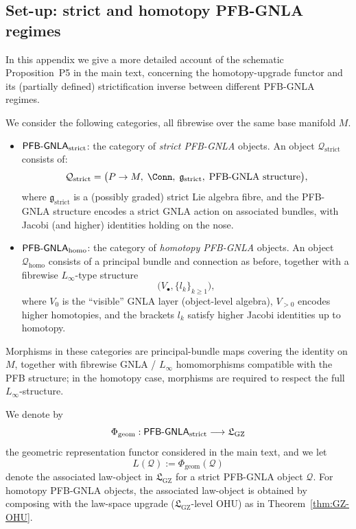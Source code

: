 \documentclass[11pt]{book}
\theoremstyle{plain}
\theoremstyle{definition}
\newcommand{\GZLS}{\ensuremath{\mathfrak{L}_{\mathrm{GZ}}}}       \newcommand{\GZLT}{\ensuremath{M_{!w}}}                           \newcommand{\GZLOC}{\ensuremath{A_M}}                             \newcommand{\GZLCurv}{\ensuremath{\mathcal{F}_{\mathrm{law}}}}
\begin{document}
\subsection*{Set-up: strict and homotopy PFB-GNLA regimes}


In this appendix we give a more detailed account of the schematic
Proposition~P5 in the main text, concerning the homotopy-upgrade
functor and its (partially defined) strictification inverse between
different PFB-GNLA regimes.

We consider the following categories, all fibrewise over the same base
manifold \(M\).

\begin{itemize}
  \item \(\mathsf{PFB\text- GNLA}_{\mathrm{strict}}\): the category of
        \emph{strict PFB-GNLA} objects.  An object
        \(\mathcal{Q}_{\mathrm{strict}}\) consists of:
        \[
          \mathcal{Q}_{\mathrm{strict}}
          =
          \bigl(P\to M,\;
                \Conn,\;
                \mathfrak{g}_{\mathrm{strict}},\;
                \text{PFB-GNLA structure}\bigr),
        \]
        where \(\mathfrak{g}_{\mathrm{strict}}\) is a (possibly
        graded) strict Lie algebra fibre, and the PFB-GNLA structure
        encodes a strict GNLA action on associated bundles, with
        Jacobi (and higher) identities holding on the nose.
  \item \(\mathsf{PFB\text- GNLA}_{\mathrm{homo}}\): the category of
        \emph{homotopy PFB-GNLA} objects.  An object
        \(\mathcal{Q}_{\mathrm{homo}}\) consists of a principal bundle
        and connection as before, together with a fibrewise
        \(L_\infty\)-type structure
        \[
          \bigl(V_\bullet,\{l_k\}_{k\ge 1}\bigr),
        \]
        where \(V_0\) is the “visible” GNLA layer (object-level
        algebra), \(V_{>0}\) encodes higher homotopies, and the
        brackets \(l_k\) satisfy higher Jacobi identities up to
        homotopy.
\end{itemize}

Morphisms in these categories are principal-bundle maps covering the
identity on \(M\), together with fibrewise GNLA / \(L_\infty\)
homomorphisms compatible with the PFB structure; in the homotopy case,
morphisms are required to respect the full \(L_\infty\)-structure.

We denote by
\[
  \Phi_{\mathrm{geom}} :
  \mathsf{PFB\text- GNLA}_{\mathrm{strict}}
  \longrightarrow
  \GZLS
\]
the geometric representation functor considered in the main text, and
we let
\[
  L(\mathcal{Q})
  :=
  \Phi_{\mathrm{geom}}(\mathcal{Q})
\]
denote the associated law-object in \(\GZLS\) for a strict PFB-GNLA
object \(\mathcal{Q}\).  For homotopy PFB-GNLA objects, the associated
law-object is obtained by composing with the law-space upgrade
(\(\GZLS\)-level OHU) as in Theorem~\ref{thm:GZ-OHU}.
\end{document}
